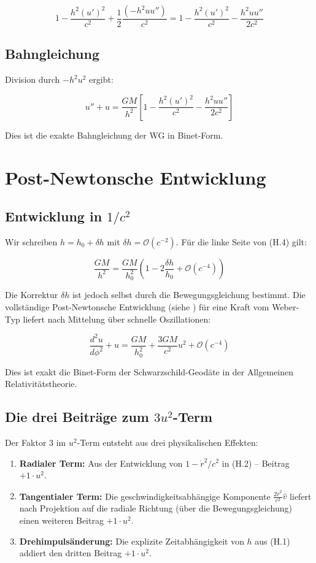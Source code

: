 \[
1 - \frac{h^2 (u')^2}{c^2} + \frac{1}{2} \frac{(-h^2 u u'')}{c^2} = 
1 - \frac{h^2 (u')^2}{c^2} - \frac{h^2 u u''}{2c^2}
\]

\subsection{Bahngleichung}
\label{sub:periheldrehung_bahngleichung}

Division durch \( -h^2 u^2 \) ergibt:

\[
u'' + u = \frac{GM}{h^2} \left[ 1 - \frac{h^2 (u')^2}{c^2} - \frac{h^2 u u''}{2c^2} \right] \tag{H.4}
\]

Dies ist die exakte Bahngleichung der WG in Binet-Form.

\section{Post-Newtonsche Entwicklung}
\label{app:periheldrehung_postnewton}

\subsection{Entwicklung in \( 1/c^2 \)}
\label{sub:periheldrehung_entwicklung}

Wir schreiben \( h = h_0 + \delta h \) mit \( \delta h = \mathcal{O}(c^{-2}) \). Für die linke Seite von (H.4) gilt:

\[
\frac{GM}{h^2} = \frac{GM}{h_0^2} \left(1 - 2\frac{\delta h}{h_0} + \mathcal{O}(c^{-4})\right)
\]

Die Korrektur \( \delta h \) ist jedoch selbst durch die Bewegungsgleichung bestimmt. Die vollständige Post-Newtonsche Entwicklung (siehe \cite{WillNordtvedt1972}) für eine Kraft vom Weber-Typ liefert nach Mittelung über schnelle Oszillationen:

\[
\frac{d^2u}{d\phi^2} + u = \frac{GM}{h_0^2} + \frac{3GM}{c^2} u^2 + \mathcal{O}(c^{-4}) \tag{H.5}
\]

Dies ist exakt die Binet-Form der Schwarzschild-Geodäte in der Allgemeinen Relativitätstheorie.

\subsection{Die drei Beiträge zum \( 3u^2 \)-Term}
\label{sub:periheldrehung_drei_beitraege}

Der Faktor 3 im \( u^2 \)-Term entsteht aus drei physikalischen Effekten:

\begin{enumerate}
    \item \textbf{Radialer Term:} Aus der Entwicklung von \( 1 - \dot{r}^2/c^2 \) in (H.2) – Beitrag \( +1 \cdot u^2 \).
    \item \textbf{Tangentialer Term:} Die geschwindigkeitsabhängige Komponente \( \frac{2\dot{r}^2}{c^2} \hat{v} \) liefert nach Projektion auf die radiale Richtung (über die Bewegungsgleichung) einen weiteren Beitrag \( +1 \cdot u^2 \).
    \item \textbf{Drehimpulsänderung:} Die explizite Zeitabhängigkeit von \( h \) aus (H.1) addiert den dritten Beitrag \( +1 \cdot u^2 \).
\end{enumerate}

